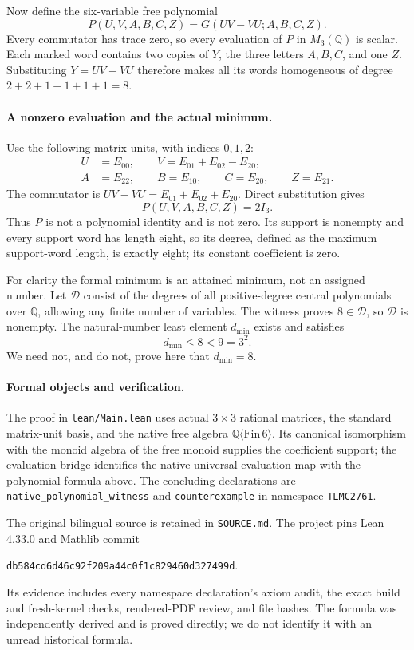 \documentclass[11pt,a4paper]{article}
\newcommand{\Q}{\mathbb Q}
\newcommand{\Mat}{M_3(\Q)}
\begin{document}
Now define the six-variable free polynomial
\[
P(U,V,A,B,C,Z)=G(UV-VU;A,B,C,Z).
\]
Every commutator has trace zero, so every evaluation of $P$ in $\Mat$
is scalar. Each marked word contains two copies of $Y$, the three
letters $A,B,C$, and one $Z$. Substituting $Y=UV-VU$ therefore makes
all its words homogeneous of degree $2+2+1+1+1+1=8$.

\paragraph{A nonzero evaluation and the actual minimum.}
Use the following matrix units, with indices $0,1,2$:
\[
\begin{split}
U&=E_{00},\qquad V=E_{01}+E_{02}-E_{20},\\
A&=E_{22},\qquad B=E_{10},\qquad C=E_{20},\qquad Z=E_{21}.
\end{split}
\]
The commutator is $UV-VU=E_{01}+E_{02}+E_{20}$. Direct substitution gives
\[
P(U,V,A,B,C,Z)=2I_3.
\]
Thus $P$ is not a polynomial identity
and is not zero. Its support is nonempty and every support word has
length eight, so its degree, defined as the maximum support-word length,
is exactly eight; its constant coefficient is zero.

For clarity the formal minimum is an attained minimum, not an assigned
number. Let $\mathcal D$ consist of the degrees of all positive-degree
central polynomials over $\Q$, allowing any finite number of variables.
The witness proves $8\in\mathcal D$, so $\mathcal D$ is nonempty.
The natural-number least element $d_{\min}$ exists and satisfies
\[
d_{\min}\le8<9=3^2.
\]
We need not, and do not, prove here that $d_{\min}=8$.

\paragraph{Formal objects and verification.}
The proof in \texttt{lean/Main.lean} uses actual $3\times3$ rational
matrices, the standard matrix-unit basis, and the native free algebra
$\Q\langle\mathrm{Fin}\,6\rangle$. Its canonical isomorphism with the
monoid algebra of the free monoid supplies the coefficient support;
the evaluation bridge identifies the native universal evaluation map
with the polynomial formula above. The concluding declarations are
\texttt{native\_polynomial\_witness} and \texttt{counterexample} in
namespace \texttt{TLMC2761}.

The original bilingual source is retained in \texttt{SOURCE.md}.
The project pins Lean 4.33.0 and Mathlib commit
\begin{center}\small
\texttt{db584cd6d46c92f209a44c0f1c829460d327499d}.
\end{center}
Its evidence includes every namespace declaration's axiom audit,
the exact build and fresh-kernel checks, rendered-PDF review, and file
hashes. The formula was independently derived and is proved directly;
we do not identify it with an unread historical formula.
\end{document}
